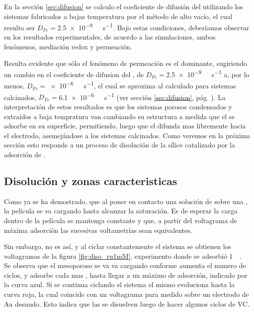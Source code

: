 		En la sección \ref{sec:difusion} se calculo el coeficiente de difusión del \fc\space utilizando los sistemas fabricados a bajas temperatura por el método de alto vacío, el cual resulto ser $D_{Fc}=$\SI{2.5e-9}{\per\Molar\per\second}. Bajo estas condiciones, deberíamos observar en los resultados experimentales, de acuerdo a las simulaciones, ambos fenómenos, mediación redox y permeación.

		Resulta evidente que sólo el fenómeno de permeación es el dominante, sugiriendo un cambio en el coeficiente de difusion del \fc, de $D_{Fc}=$\SI{2.5e-9}{\per\Molar\per\second} a, por lo menos, $D_{Fc}\!=$\SI{e-6}{\per\Molar\per\second}, el cual se aproxima al calculado para sistemas calcinados,  $D_{Fc}=$\SI{6.1e-6}{\per\Molar\per\second} (ver sección \ref{sec:difusion}, pág. \pageref{sec:difusion}). La interpretación de estos resultados es que los sistemas porosos condensados y extraídos a baja tempratura van cambiando su estructura a medida que el \ru\space se adsorbe en su superficie, permitiendo, luego que el \fc\space difunda mas libremente hacia el electrodo, asemejándose a los sistemas calcinados. Como veremos en la próxima sección esto responde a un proceso de disolución de la sílice catalizado por la adsorción de \aminorutenio.

	\subsection{Disolución y zonas caracteristicas}

		Como ya se ha demostrado, que al poner en contacto una solución de \ru\space sobre una \pdmF\space, la película se va cargando hasta alcanzar la saturación. Es de esperar la carga dentro de la película se mantenga constante y que, a partir del voltagrama de máxima adsorción las sucesivas voltametrías sean equivalentes.

		Sin embargo, no es así, y al ciclar constantemente el sistema se obtienen los voltagramas de la figura \ref{fig:diso_ru1mM}, experimento donde se adsorbió \ru\space \SI{1}{\milli\Molar}. Se observa que el mesoporoso se va va cargando conforme aumenta el numero de ciclos, y adsorbe cada mas \ru\space, hasta llegar a un máximo de adsorción, indicado por la curva azul. Si se continua ciclando el sistema el mismo evoluciona hasta la curva roja, la cual coincide con un voltagrama para \ru\space medido sobre un electrodo de Au desnudo. Esto indica que las \pdm\space se disuelven luego de hacer algunos ciclos de VC.

